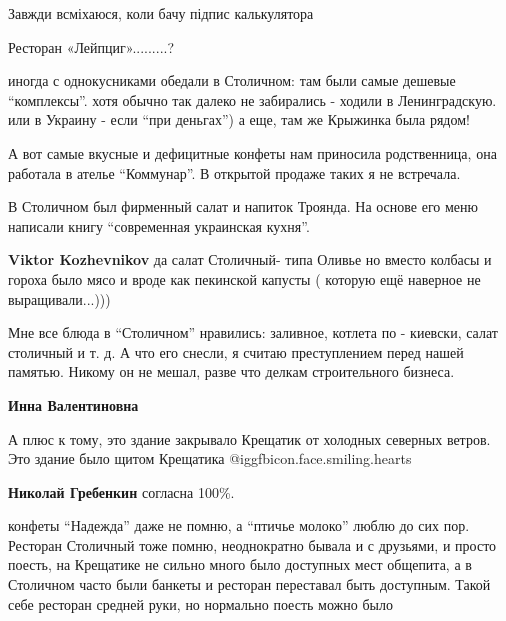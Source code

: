 \begin{itemize}
Завжди всміхаюся, коли бачу підпис калькулятора

Ресторан «Лейпциг».........?


иногда с однокусниками обедали в Столичном: там были самые дешевые \enquote{комплексы}.
хотя обычно так далеко не забирались - ходили в Ленинградскую. или в Украину -
если \enquote{при деньгах}) а еще, там же Крыжинка была рядом!



А вот самые вкусные и дефицитные конфеты нам приносила родственница, она
работала в ателье \enquote{Коммунар}. В открытой продаже таких я не встречала.



В Столичном был фирменный салат и напиток Троянда. На основе его меню написали
книгу \enquote{современная украинская кухня}.

\begin{itemize} %
\textbf{Viktor Kozhevnikov} да салат Столичный- типа Оливье но вместо колбасы и гороха было мясо и вроде как пекинской капусты ( которую ещё наверное не выращивали...)))
\end{itemize} %


Мне все блюда в \enquote{Столичном} нравились: заливное, котлета по - киевски,
салат столичный и т. д. А что его снесли, я считаю преступлением перед нашей
памятью.  Никому он не мешал, разве что делкам строительного бизнеса.

\begin{itemize} %
\textbf{Инна Валентиновна} 

А плюс к тому, это здание закрывало Крещатик от холодных северных ветров. Это
здание было щитом Крещатика @igg{fbicon.face.smiling.hearts} 

\textbf{Николай Гребенкин} согласна 100\%.
\end{itemize} %


конфеты \enquote{Надежда} даже не помню, а \enquote{птичье молоко} люблю до сих пор. Ресторан
Столичный тоже помню, неоднократно бывала и с друзьями, и просто поесть, на
Крещатике не сильно много было доступных мест общепита, а в Столичном часто
были банкеты и ресторан переставал быть доступным. Такой себе ресторан средней
руки, но нормально поесть можно было


\end{itemize}
